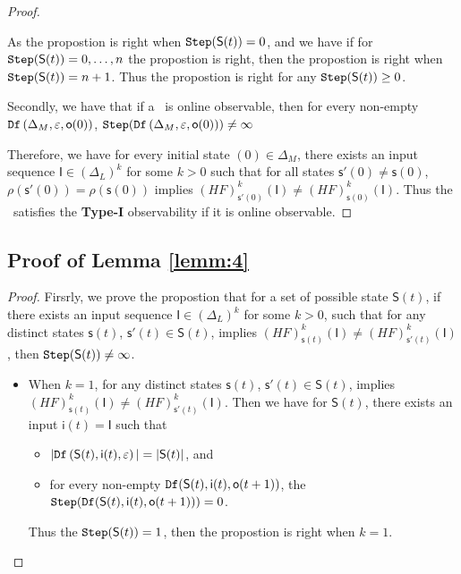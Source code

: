 \begin{appendices}
\begin{proof}
\begin{itemize}
\end{itemize}
As the propostion is right when ${\tt Step}(\mathsf{S}(t))=0$, and we have if for ${\tt Step}(\mathsf{S}(t))=0,\ldots, n$ the propostion is right, then the propostion is right when ${\tt Step}(\mathsf{S}(t))=n+1$. Thus the propostion is right for any ${\tt Step}(\mathsf{S}(t))\ge0$.

Secondly, we have that if a \BCN\ is online observable,
then for every  non-empty ${\tt Df}\left(\Delta_M,\varepsilon, \mathsf{o}(0)\right)$, ${\tt Step}({\tt Df}\left(\Delta_M,\varepsilon, \mathsf{o}(0)\right))\ne \infty$

Therefore, we have for every initial state \State$(0)$$\in \Delta_M$, there exists an input sequence $\mathsf{I}\in(\Delta_L)^{k}$ for some $k >0$ such that for all states $\mathsf{s}'(0)\neq \mathsf{s}(0)$, $\rho(\mathsf{s}'(0))=\rho(\mathsf{s}(0))$ implies $(HF)^{k}_{\mathsf{s}'(0)}(\mathsf{I})\neq (HF)^{k}_{{\mathsf{s}(0)}}(\mathsf{I})$. Thus the \BCN\ satisfies the  {\bf Type-I} observability if it is online observable.
\end{proof}

\subsection{Proof of Lemma \ref{lemm:4}}

\begin{proof}
Firsrly, we prove the propostion that for a set of possible state $\mathsf{S}(t)$, if there exists an input sequence $\mathsf{I}\in(\Delta_L)^{k}$ for some $k >0$, such that for any distinct states $\mathsf{s}(t)$, $\mathsf{s}'(t) \in \mathsf{S}(t)$, implies $(HF)^{k}_{\mathsf{s}(t)}(\mathsf{I})\neq (HF)^{k}_{\mathsf{s}'(t)}(\mathsf{I})$, then ${\tt Step}(\mathsf{S}(t))\ne\infty$.

\begin{itemize}
\item When $k=1$, for any distinct states $\mathsf{s}(t)$, $\mathsf{s}'(t) \in \mathsf{S}(t)$, implies $(HF)^{k}_{\mathsf{s}(t)}(\mathsf{I})\neq (HF)^{k}_{\mathsf{s}'(t)}(\mathsf{I})$. Then we have for $\mathsf{S}(t)$,
 there exists an input $\mathsf{i}(t)=\mathsf{I}$ such that
 \begin{itemize}
 \item  $|{\tt Df}\left(\mathsf{S}(t),\mathsf{i}(t),\varepsilon\right)|=|\mathsf{S}(t)|$, and 
 \item  for every non-empty ${\tt Df}(\mathsf{S}(t),\mathsf{i}(t),\mathsf{o}(t+1))$, the ${\tt Step}({\tt Df}(\mathsf{S}(t),\mathsf{i}(t),\mathsf{o}(t+1)))=0$.
 \end{itemize}
Thus the ${\tt Step}(\mathsf{S}(t))=1$, then the propostion is right when $k =1$.


\end{itemize}
\end{proof}
\end{appendices}
